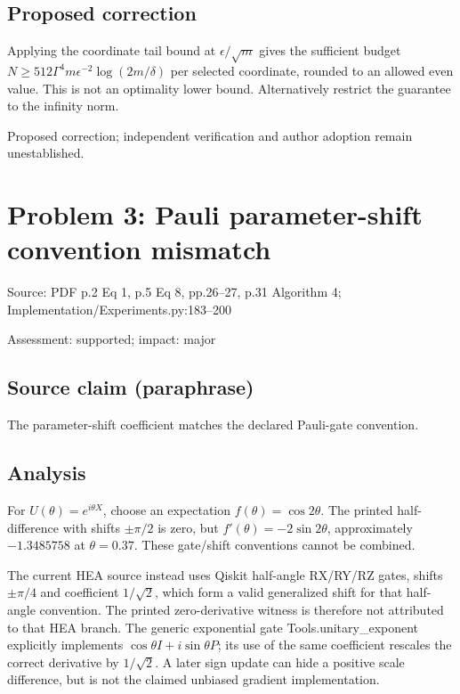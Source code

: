 \documentclass[11pt]{article}
\begin{document}
\subsection*{Proposed correction}

Applying the coordinate tail bound at \(\epsilon/\sqrt m\) gives the sufficient budget \(N\ge512\Gamma^4m\epsilon^{-2}\log(2m/\delta)\) per selected coordinate, rounded to an allowed even value. This is not an optimality lower bound. Alternatively restrict the guarantee to the infinity norm.

Proposed correction; independent verification and author adoption remain unestablished.

\section*{Problem 3: Pauli parameter-shift convention mismatch}

Source: PDF p.2 Eq 1, p.5 Eq 8, pp.26–27, p.31 Algorithm 4; Implementation/Experiments.py:183–200

Assessment: supported; impact: major

\subsection*{Source claim (paraphrase)}

The parameter-shift coefficient matches the declared Pauli-gate convention.

\subsection*{Analysis}

For \(U(\theta)=e^{i\theta X}\), choose an expectation \(f(\theta)=\cos2\theta\). The printed half-difference with shifts \(\pm\pi/2\) is zero, but \(f'(\theta)=-2\sin2\theta\), approximately \(-1.3485758\) at \(\theta=0.37\). These gate/shift conventions cannot be combined.

The current HEA source instead uses Qiskit half-angle RX/RY/RZ gates, shifts \(\pm\pi/4\) and coefficient \(1/\sqrt2\), which form a valid generalized shift for that half-angle convention. The printed zero-derivative witness is therefore not attributed to that HEA branch. The generic exponential gate Tools.unitary\_exponent explicitly implements \(\cos\theta I+i\sin\theta P\); its use of the same coefficient rescales the correct derivative by \(1/\sqrt2\). A later sign update can hide a positive scale difference, but is not the claimed unbiased gradient implementation.
\end{document}
